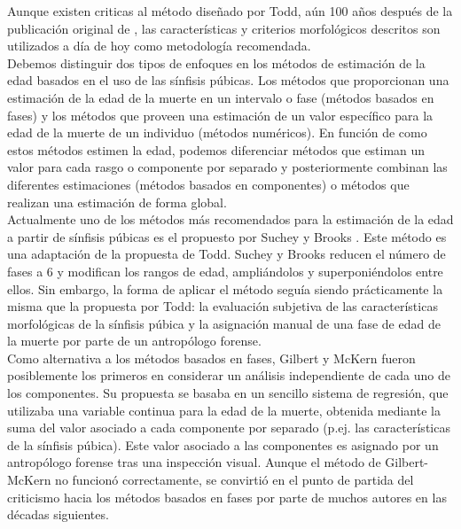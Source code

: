 Aunque existen criticas al método diseñado por Todd, aún 100 años después de la publicación original de \cite{todd1921age}, las características y criterios morfológicos descritos son utilizados a día de hoy como metodología recomendada.\\

Debemos distinguir dos tipos de enfoques en los métodos de estimación de la edad basados en el uso de las sínfisis púbicas. Los métodos que proporcionan una estimación de la edad de la muerte en un intervalo o fase (métodos basados en fases) y los métodos que proveen una estimación de un valor específico para la edad de la muerte de un individuo (métodos numéricos).
En función de como estos métodos estimen la edad, podemos diferenciar métodos que estiman un valor para cada rasgo o componente por separado y posteriormente combinan las diferentes estimaciones (métodos basados en componentes) o métodos que realizan una estimación de forma global.\\

Actualmente uno de los métodos más recomendados para la estimación de la edad a partir de sínfisis púbicas es el propuesto por Suchey y Brooks \cite{brooks1990skeletal}. Este método es una adaptación de la propuesta de Todd. Suchey y Brooks reducen el número de fases a 6 y modifican los rangos de edad, ampliándolos y superponiéndolos entre ellos. Sin embargo, la forma de aplicar el método seguía siendo prácticamente la misma que la propuesta por Todd: la evaluación subjetiva de las características morfológicas de la sínfisis púbica y la asignación manual de una fase de edad de la muerte por parte de un antropólogo forense.
\\

Como alternativa a los métodos basados en fases, Gilbert y McKern \cite{gilbert1973method} fueron posiblemente los primeros en considerar un análisis independiente de cada uno de los componentes. Su propuesta se basaba en un sencillo sistema de regresión, que utilizaba una variable continua para la edad de la muerte, obtenida mediante la suma del valor asociado a cada componente por separado (p.ej. las características de la sínfisis púbica). Este valor asociado a las componentes es asignado por un antropólogo forense tras una inspección visual. Aunque el método de Gilbert-McKern no funcionó correctamente, se convirtió en el punto de partida del criticismo hacia los métodos basados en fases por parte de muchos autores en las décadas siguientes.
\\


